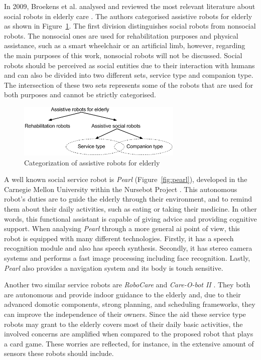 In 2009, Broekens et al. analysed and reviewed the most relevant literature about social robots in elderly care \cite{Broekens2009}.
The authors categorised assistive robots for elderly as shown in Figure~\ref{fig:categorization}.
The first division distinguishes social robots from nonsocial robots.
The nonsocial ones are used for rehabilitation purposes and physical assistance, such as a smart wheelchair or an artificial limb, however, regarding the main purposes of this work, nonsocial robots will not be discussed.
Social robots should be perceived as social entities due to their interaction with humans and can also be divided into two different sets, service type and companion type.
The intersection of these two sets represents some of the robots that are used for both purposes and cannot be strictly categorised.

\begin{figure}[h!]
  \centering
    \includegraphics[width=0.7\textwidth]{./img/categorization_robots}
  \caption{Categorization of assistive robots for elderly}
\label{fig:categorization}
\end{figure}

A well known social service robot is \emph{Pearl} (Figure~\ref{fig:pearl}), developed in the Carnegie Mellon University within the Nursebot Project \cite{Pollack2002}.
This autonomous robot's duties are to guide the elderly through their environment, and to remind them about their daily activities, such as eating or taking their medicine.
In other words, this functional assistant is capable of giving advice and providing cognitive support.
When analysing \emph{Pearl} through a more general \ac{ai} point of view, this robot is equipped with many different technologies.
Firstly, it has a speech recognition module and also has speech synthesis.
Secondly, it has stereo camera systems and performs a fast image processing including face recognition.
Lastly, \emph{Pearl} also provides a navigation system and its body is touch sensitive.

Another two similar service robots are \emph{RoboCare} \cite{Bahadori} and \emph{Care-O-bot II} \cite{Graf2004}.
They both are autonomous and provide indoor guidance to the elderly and, due to their advanced domotic components, strong planning, and scheduling frameworks, they can improve the independence of their owners.
Since the aid these service type robots may grant to the elderly covers most of their daily basic activities, the involved concerns are amplified when compared to the proposed robot that plays a card game.
These worries are reflected, for instance, in the extensive amount of sensors these robots should include.

